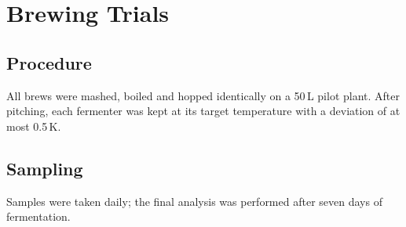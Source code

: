 \chapter{Brewing Trials}
\label{cha:implementation}

\section{Procedure}
All brews were mashed, boiled and hopped identically on a 50\,L pilot plant. After
pitching, each fermenter was kept at its target temperature with a deviation of at most
0.5\,K.

\section{Sampling}
Samples were taken daily; the final analysis was performed after seven days of fermentation.
